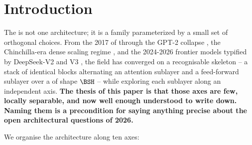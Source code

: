 
\section{Introduction}
\label{sec:introduction}

The  is not one architecture; it is a family parameterized
by a small set of orthogonal choices. From the 2017 
of \citet{vaswani2017} through the GPT-2  collapse
\citep{radford2019-gpt2}, the Chinchilla-era dense scaling regime
\citep{hoffmann2022-chinchilla}, and the 2024-2026 frontier models
typified by DeepSeek-V2 and V3 \citep{deepseek-v2,deepseek-v3}, the
field has converged on a recognisable skeleton -- a stack of
identical blocks alternating an attention sublayer and a feed-forward
sublayer over a  of shape $\BSH$ -- while exploring
each sublayer along an independent axis. \textbf{The thesis of this
paper is that those axes are few, locally separable, and now well
enough understood to write down. Naming them is a precondition for
saying anything precise about the open architectural questions of
2026.}

We organise the architecture along ten axes:

